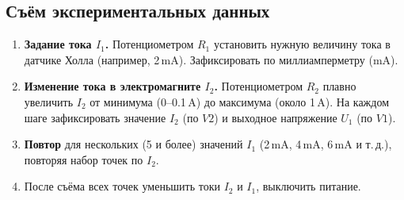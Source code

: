 \documentclass[12pt,a4paper]{article}
\begin{document}
\subsection{Съём экспериментальных данных}

\begin{enumerate}
    \item \textbf{Задание тока $I_1$.} Потенциометром $R_1$ установить нужную величину тока в датчике Холла (например, 2\,mA). Зафиксировать по миллиамперметру (mA). 
    \item \textbf{Изменение тока в электромагните $I_2$.} Потенциометром $R_2$ плавно увеличить $I_2$ от минимума (0--0.1\,A) до максимума (около 1\,A). На каждом шаге зафиксировать значение $I_2$ (по $V2$) и выходное напряжение $U_1$ (по $V1$).
    \item \textbf{Повтор} для нескольких (5 и более) значений $I_1$ (2\,mA, 4\,mA, 6\,mA и т.\,д.), повторяя набор точек по $I_2$.
    \item После съёма всех точек уменьшить токи $I_2$ и $I_1$, выключить питание.
\end{enumerate}
\end{document}
